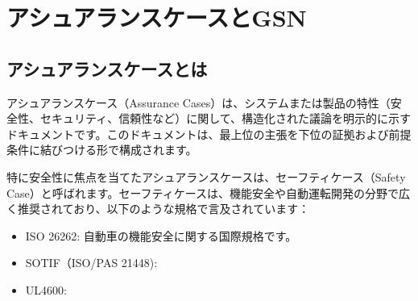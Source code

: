 \chapter{アシュアランスケースとGSN}
\label{chap5}



\section{アシュアランスケースとは}

アシュアランスケース（Assurance Cases）は、システムまたは製品の特性（安全性、セキュリティ、信頼性など）に関して、構造化された議論を明示的に示すドキュメントです。このドキュメントは、最上位の主張を下位の証拠および前提条件に結びつける形で構成されます。

特に安全性に焦点を当てたアシュアランスケースは、セーフティケース（Safety Case）と呼ばれます。セーフティケースは、機能安全や自動運転開発の分野で広く推奨されており、以下のような規格で言及されています：

\begin{itemize}
    \item ISO 26262: 自動車の機能安全に関する国際規格です。
    \item SOTIF（ISO/PAS 21448):
    \item UL4600:
\end{itemize}

%
%

%




